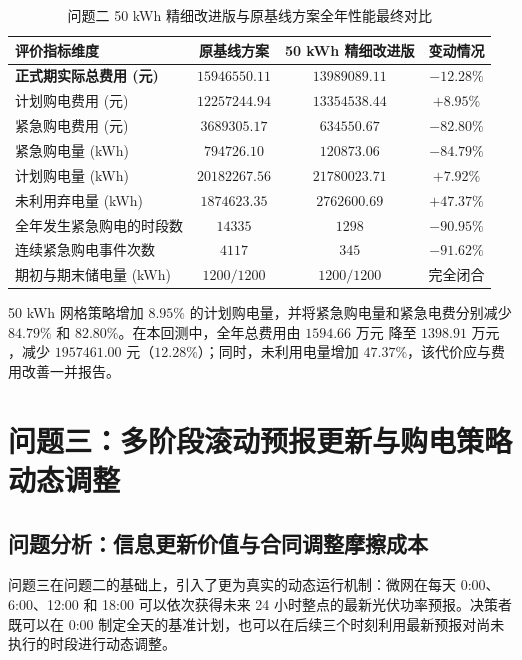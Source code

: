\documentclass[withoutpreface]{cumcmthesis}
\begin{document}
\begin{table}[htbp]
\centering
\renewcommand{\arraystretch}{1.2}
\caption{问题二 50 kWh 精细改进版与原基线方案全年性能最终对比}
\label{tab:q2_final_summary}
\begin{tabular*}{\textwidth}{@{\extracolsep{\fill}}lccc@{}}
\toprule[1.5pt]
评价指标维度 & 原基线方案 & 50 kWh 精细改进版 & 变动情况 \\
\midrule[1pt]
\textbf{正式期实际总费用 (元)} & $15946550.11$ & $\mathbf{13989089.11}$ & $\mathbf{-12.28\%}$ \\
计划购电费用 (元)            & $12257244.94$ & $13354538.44$          & $+8.95\%$ \\
紧急购电费用 (元)            & $3689305.17$  & $\mathbf{634550.67}$   & $\mathbf{-82.80\%}$ \\
紧急购电量 (kWh)             & $794726.10$   & $\mathbf{120873.06}$   & $\mathbf{-84.79\%}$ \\
计划购电量 (kWh)             & $20182267.56$ & $21780023.71$          & $+7.92\%$ \\
未利用弃电量 (kWh)           & $1874623.35$  & $2762600.69$           & $+47.37\%$ \\
全年发生紧急购电的时段数     & $14335$       & $1298$                 & $-90.95\%$ \\
连续紧急购电事件次数         & $4117$        & $345$                  & $-91.62\%$ \\
期初与期末储电量 (kWh)       & $1200 / 1200$ & $1200 / 1200$          & 完全闭合 \\
\bottomrule[1.5pt]
\end{tabular*}
\end{table}

50 kWh 网格策略增加 $8.95\%$ 的计划购电量，并将紧急购电量和紧急电费分别减少 $84.79\%$ 和 $82.80\%$。在本回测中，全年总费用由 $1594.66\text{ 万元}$ 降至 $1398.91\text{ 万元}$，减少 $1957461.00\text{ 元}$（$12.28\%$）；同时，未利用电量增加 $47.37\%$，该代价应与费用改善一并报告。
\section{问题三：多阶段滚动预报更新与购电策略动态调整}

\subsection{问题分析：信息更新价值与合同调整摩擦成本}
问题三在问题二的基础上，引入了更为真实的动态运行机制：微网在每天 0:00、6:00、12:00 和 18:00 可以依次获得未来 24 小时整点的最新光伏功率预报。决策者既可以在 0:00 制定全天的基准计划，也可以在后续三个时刻利用最新预报对尚未执行的时段进行动态调整。
\end{document}
